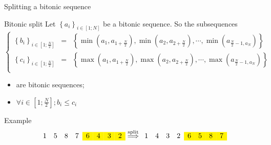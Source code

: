 \documentclass[compress,10pt,aspectratio=169]{beamer}
\begin{document}
\begin{frame}[fragile]{Splitting a bitonic sequence}
    \scriptsize

    \begin{exampleblock}{\small Bitonic split}
        Let $\left\{a_{i}\right\}_{i\in\left[1;N\right]}$ be a bitonic sequence. So the subsequences 
        \[
            \left\{
            \begin{array}{lcl}
                \left\{b_{i}\right\}_{i\in\left[1;\frac{N}{2}\right]} & = & \left\{\min(a_{1},a_{1+\frac{N}{2}}), \min(a_{2},a_{2+\frac{N}{2}}),\cdots, \min(a_{\frac{N}{2}-1,a_{N}})\right\}\\[2mm]
                \left\{c_{i}\right\}_{i\in\left[1;\frac{N}{2}\right]} & = & \left\{\max(a_{1},a_{1+\frac{N}{2}}), \max(a_{2},a_{2+\frac{N}{2}}),\cdots, \max(a_{\frac{N}{2}-1,a_{N}})\right\}\\
            \end{array}
            \right.
        \]
        \begin{itemize}
            \item are bitonic sequences;
            \item $\displaystyle \forall i\in\left[1;\frac{N}{2}\right]; b_{i} \leq c_{i}$
        \end{itemize}
    \end{exampleblock}

    \begin{block}{\small Example}
        \[
            \begin{array}{cccccccc}
                1 & 5 & 8 & 7 & \cellcolor{yellow}6 & \cellcolor{yellow}4 & \cellcolor{yellow}3 & \cellcolor{yellow}2
            \end{array}
            \stackrel{\mbox{\scriptsize split}}{\Longrightarrow}
            \begin{array}{cccccccc}
                1 & 4 & 3 & 2 & \cellcolor{yellow}6 & \cellcolor{yellow}5 & \cellcolor{yellow}8 & \cellcolor{yellow}7
            \end{array}
        \]
    \end{block}

\end{frame}
\end{document}
